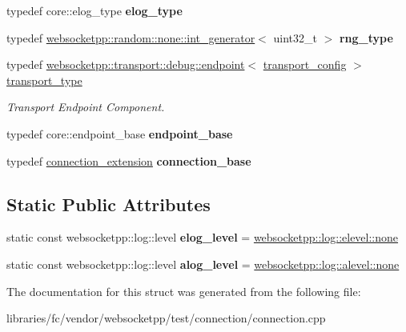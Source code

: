\begin{DoxyCompactItemize}
typedef core\+::elog\+\_\+type {\bfseries elog\+\_\+type}
\item 
\mbox{\label{structdebug__config__client_acb7ac04cb4f63e82e6f809397a91c5de}} 
typedef \mbox{\hyperlink{classwebsocketpp_1_1random_1_1none_1_1int__generator}{websocketpp\+::random\+::none\+::int\+\_\+generator}}$<$ uint32\+\_\+t $>$ {\bfseries rng\+\_\+type}
\item 
\mbox{\label{structdebug__config__client_a5d8a90aa033bf48e51bc40ba38611454}} 
typedef \mbox{\hyperlink{classwebsocketpp_1_1transport_1_1debug_1_1endpoint}{websocketpp\+::transport\+::debug\+::endpoint}}$<$ \mbox{\hyperlink{structdebug__config__client_1_1transport__config}{transport\+\_\+config}} $>$ \mbox{\hyperlink{structdebug__config__client_a5d8a90aa033bf48e51bc40ba38611454}{transport\+\_\+type}}
\begin{DoxyCompactList}\small\item\em Transport Endpoint Component. \end{DoxyCompactList}\item 
\mbox{\label{structdebug__config__client_a2bec8c54b40bc46f8e12061f8d5568c4}} 
typedef core\+::endpoint\+\_\+base {\bfseries endpoint\+\_\+base}
\item 
\mbox{\label{structdebug__config__client_a19d48b3bd4c5fbc8a4c6162b10b0c8f0}} 
typedef \mbox{\hyperlink{structconnection__extension}{connection\+\_\+extension}} {\bfseries connection\+\_\+base}
\end{DoxyCompactItemize}
\subsection*{Static Public Attributes}
\begin{DoxyCompactItemize}
\item 
\mbox{\label{structdebug__config__client_a79da8f2fa51e626728ca1e2dcadb18d2}} 
static const websocketpp\+::log\+::level {\bfseries elog\+\_\+level} = \mbox{\hyperlink{structwebsocketpp_1_1log_1_1elevel_ae86395aa26ec2089e07fd63b62a549fa}{websocketpp\+::log\+::elevel\+::none}}
\item 
\mbox{\label{structdebug__config__client_ae175641f2ff19749ea3fafd1ff29919b}} 
static const websocketpp\+::log\+::level {\bfseries alog\+\_\+level} = \mbox{\hyperlink{structwebsocketpp_1_1log_1_1alevel_a4cf0520816094999975fe73081cf30f2}{websocketpp\+::log\+::alevel\+::none}}
\end{DoxyCompactItemize}


The documentation for this struct was generated from the following file\+:\begin{DoxyCompactItemize}
\item 
libraries/fc/vendor/websocketpp/test/connection/connection.\+cpp\end{DoxyCompactItemize}
